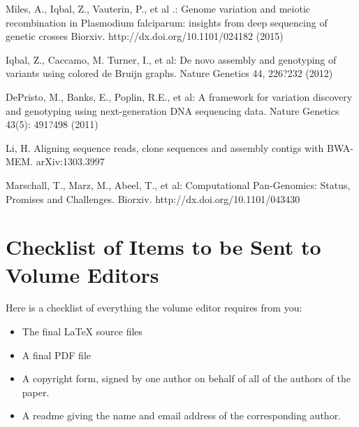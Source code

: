 \documentclass[runningheads,a4paper]{llncs}
\begin{document}
\begin{thebibliography}{4}
 Miles, A., Iqbal, Z., Vauterin, P., et al .: Genome variation and meiotic recombination in Plasmodium falciparum: insights from deep sequencing of genetic crosses Biorxiv. http://dx.doi.org/10.1101/024182 (2015)

 Iqbal, Z., Caccamo, M. Turner, I.,  et al: De novo assembly and genotyping of variants using colored de Bruijn graphs. Nature Genetics  44, 226?232 (2012)

 DePristo, M., Banks, E., Poplin, R.E., et al: A framework for variation discovery and genotyping using next-generation DNA sequencing data. Nature Genetics 43(5): 491?498 (2011)

 Li, H. Aligning sequence reads, clone sequences and assembly contigs with BWA-MEM. 	arXiv:1303.3997

 Marschall, T., Marz, M., Abeel, T., et al: Computational Pan-Genomics: Status, Promises and Challenges. Biorxiv. http://dx.doi.org/10.1101/043430

\end{thebibliography}


\section{Checklist of Items to be Sent to Volume Editors}
Here is a checklist of everything the volume editor requires from you:


\begin{itemize}
\settowidth{\leftmargin}{{\Large$\square$}}\advance\leftmargin{}
\itemsep8pt\relax
\renewcommand\labelitemi{{\lower1.5pt\hbox{\Large$\square$}}}

\item The final \LaTeX{} source files
\item A final PDF file
\item A copyright form, signed by one author on behalf of all of the
authors of the paper.
\item A readme giving the name and email address of the
corresponding author.
\end{itemize}
\end{document}
